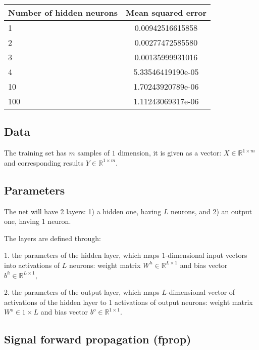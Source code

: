 \documentclass[]{article}
\theoremstyle{definition}
\begin{document}
\begin{table}
		\begin{center}
	\begin{tabular}{ | l | c | }
		\hline
		Number of hidden neurons & Mean squared error \\ \hline
		1 & 0.00942516615858  \\ \hline
		2 & 0.00277472585580  \\ \hline
		3 & 0.00135999931016  \\ \hline
		4 & 5.33546419190e-05  \\ \hline
		10 & 1.70243920789e-06  \\ \hline
		100 & 1.11243069317e-06  \\ \hline
		\hline
	\end{tabular}
		\end{center}
\end{table}



\newpage
\subsection{Data}

The training set has $m$ samples of $1$ dimension, it is given as a vector: $X \in \mathbb{R}^{1\times m}$ and corresponding results
$Y\in \mathbb{R}^{1\times m}$.

\subsection{Parameters}

The net will have 2 layers: 1) a hidden one, having $L$ neurons,
and 2) an output one, having $1$ neuron.

The layers are defined through:

1. the parameters of the hidden layer, which maps $1$-dimensional input vectors
into activations of $L$ neurons:
weight matrix $W^h\in\mathbb{R}^{L\times 1	}$ and bias vector
$b^h\in\mathbb{R}^{L\times 1}$,

2. the parameters of the output layer, which maps $L$-dimensional vector
of activations of the hidden layer to 1 activations of output neurons:
weight matrix $W^o\in{1\times L}$ and bias vector $b^o\in\mathbb{R}^{1\times 1}$.


\subsection{Signal forward propagation (fprop)}
\end{document}
